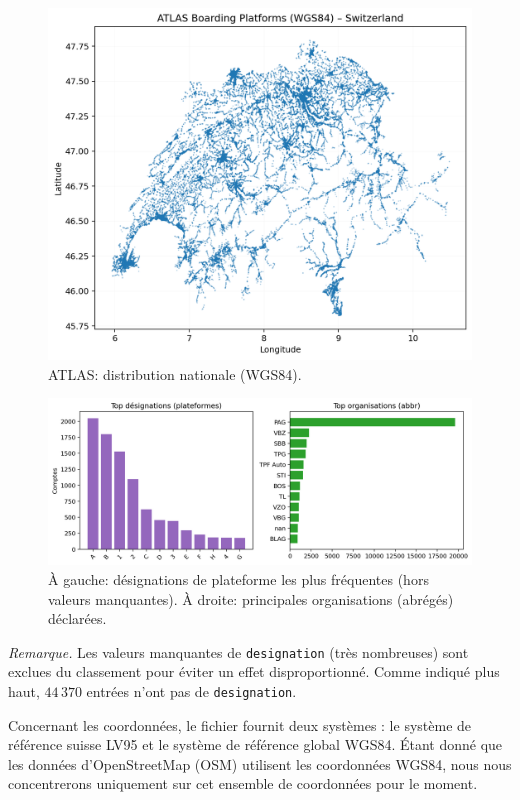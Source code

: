 \begin{figure}[H]
  \centering
  \includegraphics[width=.76\linewidth]{figures/plots/atlas_points_switzerland.png}
  \caption[ATLAS: distribution nationale]{ATLAS: distribution nationale (WGS84).}
  \label{fig:atlas_ch_points}
\end{figure}

\begin{figure}[H]
  \centering
  \includegraphics[width=.85\linewidth]{figures/plots/atlas_designation_operators.png}
  \caption[Désignations et opérateurs ATLAS]{À gauche: désignations de plateforme les plus fréquentes (hors valeurs manquantes). À droite: principales organisations (abrégés) déclarées.}
  \label{fig:atlas_distribs}
\end{figure}

\noindent\textit{Remarque.} Les valeurs manquantes de \texttt{designation} (très nombreuses) sont exclues du classement pour éviter un effet disproportionné. Comme indiqué plus haut, \(44\,370\) entrées n'ont pas de \texttt{designation}.

Concernant les coordonnées, le fichier fournit deux systèmes : le système de référence suisse LV95 et le système de référence global WGS84. Étant donné que les données d'OpenStreetMap (OSM) utilisent les coordonnées WGS84, nous nous concentrerons uniquement sur cet ensemble de coordonnées pour le moment.

